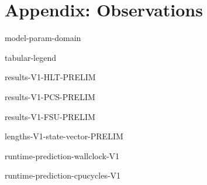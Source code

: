 \hypertarget{apx:Observations}{%
\chapter{Appendix: Observations}\label{apx:Observations}}


\newcommand{\ObservationTable}[3]{%
\begin{table}[!ht]
\centering
\caption{%
\label{tab:V#1-#3}%
Observations for \CGKAmod{#2}{T}{N}$ \models \LTLPredicate{#3}$.%
}%
{results-V#1-#3-PRELIM}
\end{table}
}

\begin{table}[!ht]
\centering
\caption{%
\label{tab:model-param-domain}%
Verification domain of \( \CGKAmod{P}{T}{N} \models \varphi \) parameters.
}%
{model-param-domain}
\end{table}

\begin{table}[!ht]
\centering
\caption{%
\label{tab:table-legend}%
Legend of symbols appearing in tables.
}%
{tabular-legend}
\end{table}

\ObservationTable{1}{\VersionOne}{HLT}
\ObservationTable{1}{\VersionOne}{PCS}
\ObservationTable{1}{\VersionOne}{FSU}

\begin{table}[ht!]
\centering
\caption[State vector byte length for each model]{%
\label{tab:state-vector-len}%
State vector byte length for each model parameterization of \CGKAmod{\VersionOne}{}{}.
}%
{lengths-V1-state-vector-PRELIM}
\end{table}

\begin{table}[ht!]                                                                        
\centering
\caption[Wall clock run-time projections for ]{%
\label{tab:predicted-run-times}%
Wall clock run-time projections for \\%
$\forall\; N \in [4, 8]$ using $T \in [4, 7]$ as predictors for $T \in [8, 12]$.
}%
{runtime-prediction-wallclock-V1}
\end{table}

\begin{table}[ht!]                                                                        
\centering
\caption[CPU clock cycle projections for ]{%
\label{tab:predicted-cpu-ticks}%
CPU clock cycle projections for \\%
$\forall\; N \in [4, 8]$ using $T \in [4, 7]$ as predictors for $T \in [8, 12]$.
}%
{runtime-prediction-cpucycles-V1}
\end{table}
